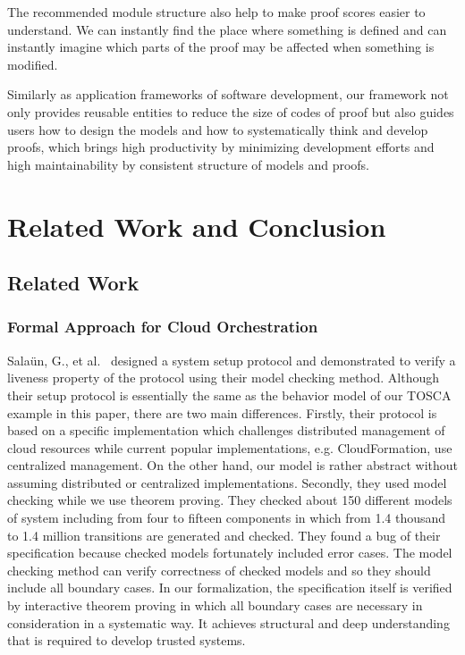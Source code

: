 \documentclass[12pt]{report}
\begin{document}
The recommended module structure also help to make proof scores easier
to understand.  We can instantly find the place where something is
defined and can instantly imagine which parts of the proof may be
affected when something is modified.

Similarly as application frameworks of software development, our
framework not only provides reusable entities to reduce the size of
codes of proof but also guides users how to design the models and how
to systematically think and develop proofs, which brings high
productivity by minimizing development efforts and high
maintainability by consistent structure of models and proofs.

\chapter{Related Work and Conclusion}
\label{chap:conclusion}
\section{Related Work}
\subsection{Formal Approach for Cloud Orchestration}
Sala{\"u}n, G., et
al.~\cite{EtcheversCBP11,SalaunBCPEG13,SalaunEPBC13} designed a system
setup protocol and demonstrated to verify a liveness property of the
protocol using their model checking method. Although their setup
protocol is essentially the same as the behavior model of our TOSCA
example in this paper, there are two main differences. Firstly, their
protocol is based on a specific implementation which challenges
distributed management of cloud resources while current popular
implementations, e.g. CloudFormation, use centralized management. On
the other hand, our model is rather abstract without assuming
distributed or centralized implementations. Secondly, they used model
checking while we use theorem proving. They checked about 150
different models of system including from four to fifteen components
in which from 1.4 thousand to 1.4 million transitions are generated
and checked. They found a bug of their specification because checked
models fortunately included error cases. The model checking method can
verify correctness of checked models and so they should include all
boundary cases. In our formalization, the specification itself is
verified by interactive theorem proving in which all boundary cases
are necessary in consideration in a systematic way. It achieves
structural and deep understanding that is required to develop trusted
systems.
\end{document}
